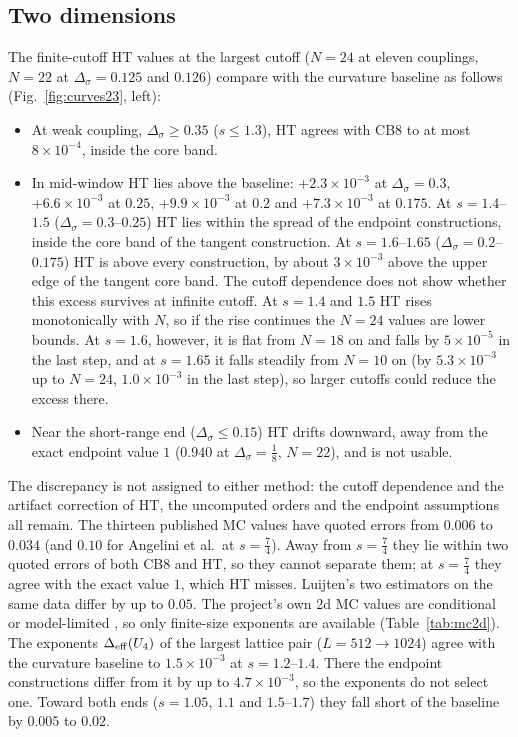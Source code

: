 \documentclass[11pt,a4paper]{article}
\numberwithin{equation}{section}
\newcommand{\Ds}{\Delta_\sigma}
\newcommand{\sci}[2]{#1\times10^{#2}}
\begin{document}
\subsection{Two dimensions}
The finite-cutoff HT values \cite{noteHT} at the largest cutoff ($N=24$ at eleven couplings,
$N=22$ at $\Ds=0.125$ and $0.126$) compare with the curvature baseline as follows
(Fig.~\ref{fig:curves23}, left):
\begin{itemize}
\item At weak coupling, $\Ds\ge0.35$ ($s\le1.3$), HT agrees with CB8 to at most
$\sci{8}{-4}$, inside the core band.
\item In mid-window HT lies above the baseline: $\sci{+2.3}{-3}$ at $\Ds=0.3$,
$\sci{+6.6}{-3}$ at $0.25$, $\sci{+9.9}{-3}$ at $0.2$ and $\sci{+7.3}{-3}$ at $0.175$.
At $s=1.4$--$1.5$ ($\Ds=0.3$--$0.25$) HT lies within the spread of the endpoint
constructions, inside the core band of the tangent construction. At $s=1.6$--$1.65$
($\Ds=0.2$--$0.175$) HT is above every construction, by about $\sci{3}{-3}$ above the upper
edge of the tangent core band. The cutoff dependence does not show whether this excess
survives at infinite cutoff. At $s=1.4$ and $1.5$ HT rises monotonically with $N$, so if the
rise continues the $N=24$ values are lower bounds. At $s=1.6$, however, it is flat from $N=18$
on and falls by $\sci{5}{-5}$ in the last step, and at $s=1.65$ it falls steadily from $N=10$
on (by $\sci{5.3}{-3}$ up to $N=24$, $\sci{1.0}{-3}$ in the last step), so larger cutoffs could
reduce the excess there.
\item Near the short-range end ($\Ds\le0.15$) HT drifts downward, away from the exact
endpoint value $1$ ($0.940$ at $\Ds=\frac18$, $N=22$), and is not usable.
\end{itemize}
The discrepancy is not assigned to either method: the cutoff dependence and the artifact
correction of HT, the uncomputed orders and the endpoint assumptions all remain. The
thirteen published MC values have quoted errors from $0.006$ to $0.034$ (and $0.10$ for
Angelini et al.\ at $s=\frac74$). Away from $s=\frac74$ they lie within two quoted errors of
both CB8 and HT, so they cannot separate them; at $s=\frac74$ they agree with the exact value
$1$, which HT misses. Luijten's two estimators on the same data differ by up to $0.05$. The
project's own 2d MC values are conditional or model-limited \cite{noteMC}, so only
finite-size exponents are available (Table~\ref{tab:mc2d}). The exponents
$\Delta_{\rm eff}(U_4)$ of the largest lattice pair ($L=512\to1024$) agree with the curvature
baseline to $\sci{1.5}{-3}$ at $s=1.2$--$1.4$. There the endpoint constructions differ from it
by up to $\sci{4.7}{-3}$, so the exponents do not select one. Toward both ends ($s=1.05$,
$1.1$ and $1.5$--$1.7$) they fall short of the baseline by $0.005$ to $0.02$.
\end{document}
